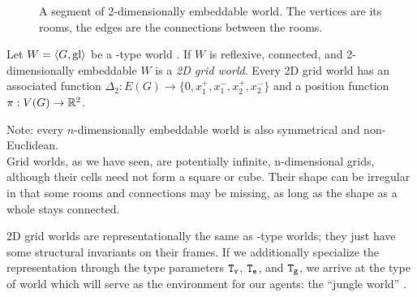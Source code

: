 \begin{figure}
	\centering
	
	\caption{A segment of 2-dimensionally embeddable world. The vertices are its rooms, the edges are the connections between the rooms.}
	\label{fig:2dgrid}
\end{figure}

\begin{definition}
	Let $W = \langle G,\mathrm{gl} \rangle$ be a \wext-type world . If $W$ is reflexive, connected, and 2-dimensionally embeddable $W$ is a {\em 2D grid world}.
	Every 2D grid world has an associated function $\Delta_2 : E(G) \rightarrow \{0,x_1^+,x_1^-,x_2^+,x_2^- \}$ and a position function $\pi : V(G) \rightarrow \mathbb{R}^2$.
\end{definition}

\noindent
Note: every $n$-dimensionally embeddable world is also symmetrical and non-Euclidean.\\

Grid worlds, as we have seen, are potentially infinite, n-dimensional grids, although their cells need not form a square or cube. Their shape can be irregular in that some rooms and connections may be missing, as long as the shape as a whole stays connected.

2D grid worlds are representationally the same as \wext-type worlds; they just have some structural invariants on their frames. If we additionally specialize the representation through the type parameters $\mathtt{T_v}$, $\mathtt{T_e}$, and $\mathtt{T_g}$, we arrive at the type of world which will serve as the environment for our agents: the ``jungle world'' \wjun.


